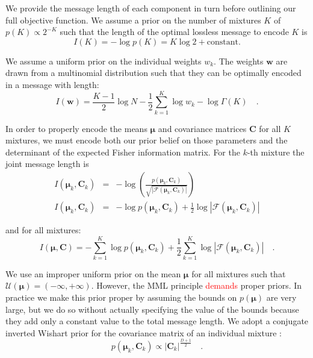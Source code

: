 \documentclass{elsarticle}
\newcommand{\todo}[1]{\textcolor{red}{#1}}
\newcommand{\vect}[1]{\boldsymbol{\mathbf{#1}}}
\def\veccov{\vect{C}}
\def\vecmean{\vect{\mu}}
\def\weight{w}
\def\weights{\vect{\weight}}
\newcommand{\fisher}[1]{\mathcal{F}\left(#1\right)}
\newcommand{\detfisher}[1]{\left|\fisher{#1}\right|}
\newcommand{\prior}[1]{p\left(#1\right)}
\begin{document}
We provide the message length of each component in turn before outlining our
full objective function. We assume a prior on the number of mixtures $K$ of
$\prior{K} \propto 2^{-K}$ \todo{\cite{someone}} such that the length of the 
optimal lossless message to encode $K$ is 
\begin{equation}
	I(K) = -\log{\prior{K}} = K\log{2} + \textrm{constant}.
\end{equation}

We assume a uniform prior on the individual weights $\weight_{k}$. The weights
$\weights$ are drawn from a multinomial distribution such that they can be 
optimally encoded in a message with length\todo{\cite{someone}}:
\begin{equation}
  I(\weights) 
    = \frac{K - 1}{2}\log{N} 
    - \frac{1}{2}\sum_{k=1}^{K}\log\weight_k 
    - \log{\Gamma{\left(K\right)}} \quad .
\end{equation}


In order to properly encode the means $\vecmean$ and covariance matrices
$\veccov$ for all $K$ mixtures, we must encode both our prior belief on 
those parameters and the determinant of the expected Fisher information 
matrix. For the $k$-th mixture the joint message length is
\begin{eqnarray}
  I(\vecmean_k,\veccov_k) &=& -\log{\left(\frac{\prior{{\vecmean_k,\veccov_k}}}{\sqrt{\detfisher{{\vecmean_k,\veccov_k}}}}\right)} \nonumber \\ 
  I(\vecmean_k,\veccov_k) &=& -\log{\prior{{\vecmean_k,\veccov_k}}} + \frac{1}{2}\log{\detfisher{{\vecmean_k,\veccov_k}}}
\end{eqnarray}

\noindent{}and for all mixtures:
\begin{equation}
  I(\vecmean,\veccov) = -\sum_{k=1}^{K}\log{\prior{{\vecmean_k,\veccov_k}}} + \frac{1}{2}\sum_{k=1}^{K}\log{\detfisher{{\vecmean_k,\veccov_k}}} \quad .
  \label{eq:I_component_params}
\end{equation}

We use an improper uniform prior on the mean $\vecmean$ for all mixtures such
that 
	$\mathcal{U}(\vecmean) = (-\infty, +\infty)$.
However,  the MML principle \todo{demands} proper priors. In practice we make 
this prior proper by assuming the bounds on $\prior{\vecmean}$ are very large, but 
we do so without actually specifying the value of the bounds because they add 
only a constant value to the total message length\todo{\cite{someone}}.
We adopt a conjugate inverted Wishart prior for the covariance matrix of an
individual mixture \cite[e.g., Section 5.2.3. of ][]{Schafer_1997}:
\begin{equation}
  \prior{{\vecmean_k, \veccov_k}} \propto |\veccov_k|^{\frac{D+1}{2}} \quad .
  \label{eq:covariance-prior}
\end{equation}
\end{document}
